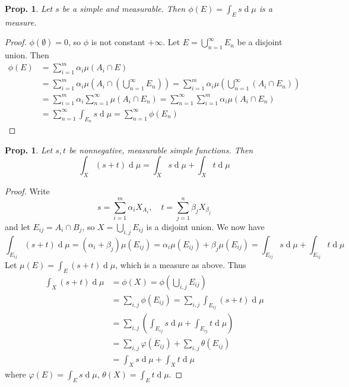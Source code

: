 \documentclass[12pt, a4paper]{book}
\renewcommand{\d}[1]{\ensuremath{\operatorname{d}\!{#1}}} %
\newtheorem{proposition}[theorem]{Prop.}
\theoremstyle{nonumberplain}
\newtheorem{proof}{Proof}
\begin{document}
\begin{proposition}
    Let $s$ be a simple and measurable.
    Then $\phi(E)=\int_Es\d{\mu}$ is a measure.
\end{proposition}
\begin{proof}
    $\phi(\emptyset)=0$, so $\phi$ is not constant $+\infty$.
    Let $E=\bigcup_{n=1}^\infty E_n$ be a disjoint union.
    Then
    \begin{align*}
        \phi(E) &=\sum\limits_{i=1}^m\alpha_i\mu(A_i\cap E)\\
                &=\sum\limits_{i=1}^m\alpha_i\mu\left(A_i\cap\left(\bigcup\limits_{n=1}^\infty E_n\right)\right)= \sum\limits_{i=1}^m\alpha_i\mu\left(\bigcup\limits_{n=1}^\infty(A_i\cap E_n)\right)\\
                &= \sum\limits_{i=1}^m\alpha_i\sum\limits_{n=1}^\infty\mu(A_i\cap E_n)= \sum\limits_{n=1}^\infty\sum\limits_{i=1}^m\alpha_i\mu(A_i\cap E_n)\\
                &= \sum\limits_{n=1}^\infty \int_{E_n}s\d{\mu}= \sum\limits_{n=1}^\infty \phi(E_n)
    \end{align*}
\end{proof}
\begin{proposition}
    Let $s,t$ be nonnegative, measurable simple functions.
    Then
    \[\int_X(s+t)\d{\mu}=\int_X s\d{\mu}+\int_X t\d{\mu}\]
\end{proposition}
\begin{proof}
    Write
    \[s=\sum\limits_{i=1}^m\alpha_i X_{A_i},\quad t=\sum\limits_{j=1}^n \beta_j X_{\beta_j}\]
    and let $E_{ij}=A_i\cap B_j$, so $X=\bigcup_{i,j} E_{ij}$ is a disjoint union.
    We now have
    \[\int_{E_{ij}}(s+t)\d{\mu}=(\alpha_i+\beta_j)\mu(E_{ij})=\alpha_i\mu(E_{ij})+\beta_j\mu(E_{ij})=\int_{E_{ij}}s\d{\mu}+\int_{E_{ij}}t\d{\mu}\]
    Let $\mu(E)=\int_E(s+t)\d{\mu}$, which is a measure as above.
    Thus
    \begin{align*}
        \int_X(s+t)\d{\mu} &= \phi(X)=\phi\left(\bigcup_{i,j}E_{ij}\right)\\
                           &= \sum\limits_{i,j}\phi(E_{ij})=\sum\limits_{i,j}\int_{E_{ij}}(s+t)\d{\mu}\\
                           &= \sum\limits_{i,j}\left(\int_{E_{ij}}s\d{\mu}+\int_{E_{ij}}t\d{\mu}\right)\\
                           &= \sum\limits_{i,j}\varphi(E_{ij})+\sum\limits_{i,j}\theta(E_{ij})\\
                           &= \int_Xs\d{\mu}+\int_X t\d{\mu}
    \end{align*}
    where $\varphi(E)=\int_E s\d{\mu}$, $\theta(X)=\int_E t\d{\mu}$.
\end{proof}
\end{document}

